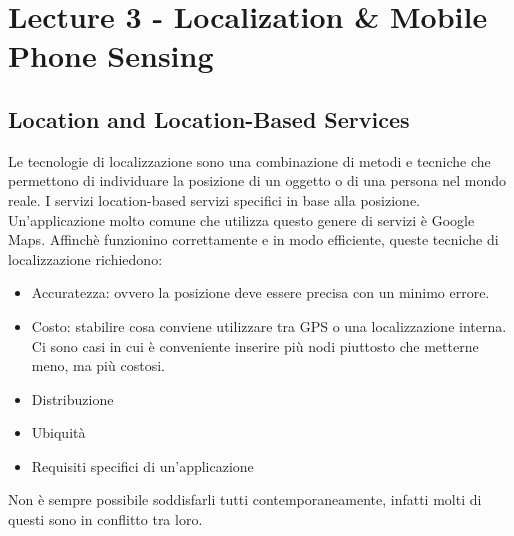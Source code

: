 
\newcommand{\tabitem}{~~\llap{\textbullet}~~}

% 
        \section{Lecture 3 - Localization \& Mobile Phone Sensing}\label{sec3}

        \subsection{Location and Location-Based Services}\label{subsec3.1}
        Le tecnologie di localizzazione sono una combinazione di metodi e
tecniche che permettono di individuare la posizione di un oggetto o di una
persona nel mondo reale. I servizi location-based servizi specifici in base alla
posizione. Un'applicazione molto comune che utilizza questo genere di servizi è
Google Maps.
        Affinchè funzionino correttamente e in modo efficiente, queste tecniche
di localizzazione richiedono:
        \begin{itemize}
                \item Accuratezza: ovvero la posizione deve essere precisa con
un minimo errore.
                \item Costo: stabilire cosa conviene utilizzare tra GPS o una
localizzazione interna. Ci sono casi in cui è conveniente inserire più nodi
piuttosto che metterne meno, ma più costosi.
                \item Distribuzione
                \item Ubiquità
                \item Requisiti specifici di un'applicazione
        \end{itemize}
        Non è sempre possibile soddisfarli tutti contemporaneamente, infatti
molti di questi sono in conflitto tra loro.

